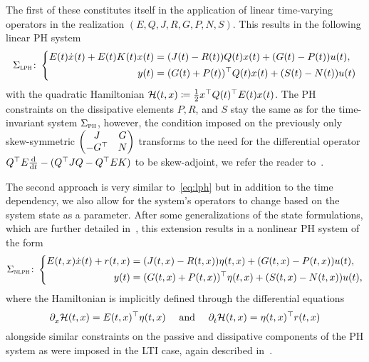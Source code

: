 \begin{remark}
    The first of these constitutes itself in the application of linear time-varying operators in the realization $(E, Q, J, R, G, P, N, S)$.
    This results in the following linear \ac{PH} system
    \begin{equation}\label{eq:lph}
        \Sigma_{\msc{lph}} \colon \left\lbrace
        \begin{aligned}
            E(t) \dot{x}(t) + E(t) K(t) x(t) &= (J(t) - R(t)) Q(t) x(t) + (G(t) - P(t)) u(t), \\
            y(t) &= (G(t) + P(t))\trans Q(t) x(t) + (S(t) - N(t)) u(t)
        \end{aligned}
        \right.
    \end{equation}
    with the quadratic Hamiltonian $\mcl{H}(t, x) \coloneqq \frac{1}{2} x\trans Q(t)\trans E(t) x(t)$.
    The \ac{PH} constraints on the dissipative elements $P, R$, and $S$ stay the same as for the time-invariant system $\Sigma_{\msc{ph}}$, however, the condition imposed on the previously only skew-symmetric $\begin{pmatrix}
        J & G \\
        -G\trans & N
    \end{pmatrix}$ transforms to the need for the differential operator $Q\trans E \frac{\dif}{\dif t} - (Q\trans J Q - Q\trans E K)$ to be skew-adjoint, we refer the reader to~\cite[Definition~4.8]{Mehrmann2023}.
\end{remark}

\begin{remark}
    The second approach is very similar to~\eqref{eq:lph} but in addition to the time dependency, we also allow for the system's operators to change based on the system state as a parameter.
    After some generalizations of the state formulations, which are further detailed in~\cite{Mehrmann2023}, this extension results in a nonlinear \ac{PH} system of the form
    \begin{equation*}
        \Sigma_{\msc{nlph}} \colon \left\lbrace
        \begin{aligned}
            E(t, x) \dot{x}(t) + r(t, x) &= (J(t, x) - R(t, x)) \eta(t, x) + (G(t, x) - P(t, x)) u(t), \\
            y(t) &= (G(t, x) + P(t, x))\trans \eta(t, x) + (S(t, x) - N(t, x)) u(t),
        \end{aligned}
        \right.
    \end{equation*}
    where the Hamiltonian is implicitly defined through the differential equations
    \begin{equation*}
        \pd{} \mcl{H}(t, x) = E(t, x)\trans \eta(t, x)\quad \text{ and }\quad \pd[t]{} \mcl{H}(t, x) = \eta(t, x)\trans r(t, x)
    \end{equation*}
    alongside similar constraints on the passive and dissipative components of the \ac{PH} system as were imposed in the \ac{LTI} case, again described in~\cite[Definition~4.1]{Mehrmann2023}.
\end{remark}

